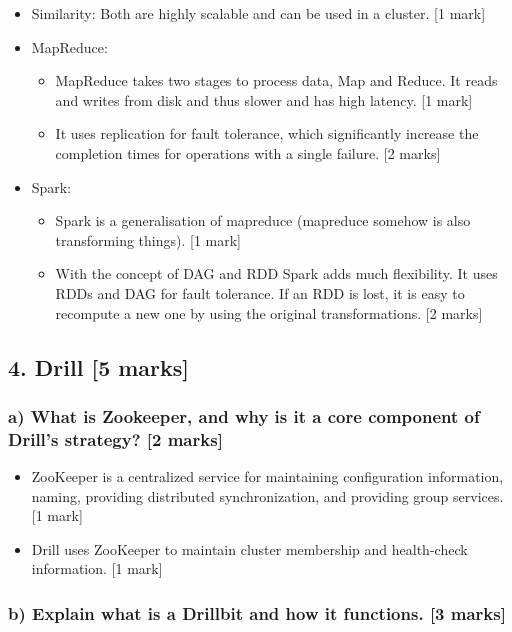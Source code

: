 \documentclass[11pt,a4paper]{article}
\begin{document}
\begin{itemize}
\item Similarity: Both are highly scalable and can be used in a cluster. [1 mark]
\item MapReduce: 
\begin{itemize}
\item MapReduce takes two stages to process data, Map and Reduce. It reads and writes from disk and thus slower and has high latency. [1 mark]
\item It uses replication for fault tolerance, which significantly increase the completion times for operations with a single failure. [2 marks]
\end{itemize}
\item Spark: 
\begin{itemize}
\item
Spark is a generalisation of mapreduce (mapreduce somehow is also
transforming things). [1 mark] 
\item
With the concept of DAG and RDD Spark adds much flexibility. It uses RDDs and DAG for fault tolerance. If an RDD is lost, it is easy to recompute a new one by using the original transformations. [2 marks]
\end{itemize}
\end{itemize}

\subsection*{4. Drill [5 marks]}

\subsubsection*{a) What is Zookeeper, and why is it a core component of Drill’s strategy? [2 marks]}

\begin{itemize}
\item ZooKeeper is a centralized service for maintaining configuration information, naming, providing distributed synchronization, and providing group services. [1 mark]
\item Drill uses ZooKeeper to maintain cluster membership and health-check information. [1 mark]
\end{itemize}

\subsubsection*{b) Explain what is a Drillbit and how it functions. [3 marks]}
\end{document}
